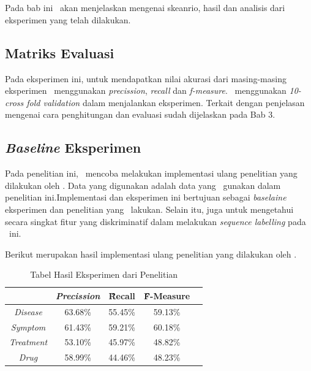 \chapter{\babLima}

Pada bab ini \saya~akan menjelaskan mengenai skeanrio, hasil dan analisis dari eksperimen yang telah dilakukan.

\section{Matriks Evaluasi}
Pada eksperimen ini, untuk mendapatkan nilai akurasi dari masing-masing eksperimen \saya~menggunakan \textit{precission}, \textit{recall} dan \textit{f-measure}. \Saya~menggunakan \textit{10-cross fold validation} dalam menjalankan eksperimen. Terkait dengan penjelasan mengenai cara penghitungan dan evaluasi sudah dijelaskan pada Bab 3.

\section{\textit{Baseline} Eksperimen}
Pada penelitian ini, \saya~mencoba melakukan implementasi ulang penelitian yang dilakukan oleh \cite{skripsiKakRadit}. Data yang digunakan adalah data yang \saya~gunakan dalam penelitian ini.Implementasi dan eksperimen ini bertujuan sebagai \textit{baselaine} eksperimen dan penelitian yang \saya~lakukan. Selain itu, juga untuk mengetahui secara singkat fitur yang diskriminatif dalam melakukan \textit{sequence labelling} pada \mer~ini.

Berikut merupakan hasil implementasi ulang penelitian yang dilakukan oleh \cite{skripsiKakRadit}.
	
\begin{table}
	\centering
	\caption{Tabel Hasil Eksperimen dari Penelitian \cite{skripsiKakRadit}}
	\begin{tabular}{|c|c|c|c|c|}
		\hline
							& \textit{Precission} & \f{\f{Recall}} & \f{\f{F-Measure}} \\ \hline
		\textit{Disease}    & 63.68\%             & 55.45\%        & 59.13\%           \\ \hline
		\textit{Symptom}    & 61.43\%             & 59.21\%        & 60.18\%           \\ \hline
		\textit{Treatment}  & 53.10\%             & 45.97\%        & 48.82\%           \\ \hline
		\textit{Drug}		& 58.99\%             & 44.46\%        & 48.23\%           \\ \hline
	    \end{tabular}
\label{table:radit}
\end{table}


